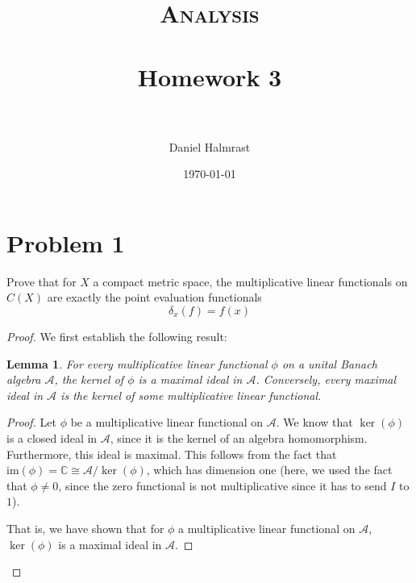 \documentclass[fontsize=11pt]{scrartcl} %
\title{	
\normalfont \normalsize 
\textsc{Analysis} \\ [25pt] %
\horrule{0.5pt} \\[0.4cm] %
\huge Homework 3 \\ %
\horrule{2pt} \\[0.5cm] %
}
\author{Daniel Halmrast} %
\date{\normalsize\today} %
\numberwithin{equation}{section} %
\numberwithin{figure}{section} %
\numberwithin{table}{section} %
\newcommand{\C}{\mathbb{C}}
\newcommand{\im}{\text{im}}
\newtheorem{lemma}{Lemma}
\begin{document}
\maketitle %

\section*{Problem 1}
Prove that for $X$ a compact metric space, the multiplicative linear functionals
on $C(X)$ are exactly the point evaluation functionals
\[
    \delta_x(f) = f(x)
\]

\begin{proof}
    We first establish the following result:
    \begin{lemma}
        For every multiplicative linear functional $\phi$ on a unital Banach
        algebra $\mathscr{A}$, the kernel of $\phi$ is a maximal ideal in
        $\mathscr{A}$. Conversely, every maximal ideal in $\mathscr{A}$ is the
        kernel of some multiplicative linear functional.
    \end{lemma}
    \begin{proof}
        Let $\phi$ be a multiplicative linear functional on $\mathscr{A}$. We
        know that $\ker(\phi)$ is a closed ideal in $\mathscr{A}$, since it is
        the kernel of an algebra homomorphism. Furthermore, this ideal is
        maximal. This follows from the fact that $\im(\phi) = \C \cong
        \mathscr{A}/{\ker(\phi)}$, which has dimension one (here, we used the
            fact that $\phi\neq 0$, since the zero functional is not
        multiplicative since it has to send $I$ to $1$).

        That is, we have shown that for $\phi$ a multiplicative linear
        functional on $\mathscr{A}$, $\ker(\phi)$ is a maximal ideal in
        $\mathscr{A}$.


\end{proof}
\end{proof}
\end{document}
